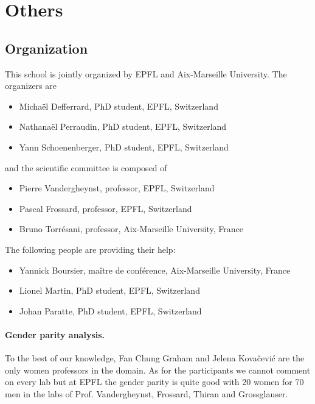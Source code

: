 \documentclass[a4paper]{scrartcl}
\begin{document}
\section{Others}

\subsection{Organization}

This school is jointly organized by EPFL and Aix-Marseille University. The
organizers are
\begin{itemize}
	\setlength{\itemsep}{0pt} \setlength{\parskip}{0pt}
	\item Michaël Defferrard, PhD student, EPFL, Switzerland
	\item Nathanaël Perraudin, PhD student, EPFL, Switzerland
	\item Yann Schoenenberger, PhD student, EPFL, Switzerland
\end{itemize}
and the scientific committee is composed of
\begin{itemize}
	\setlength{\itemsep}{0pt} \setlength{\parskip}{0pt}
	\item Pierre Vandergheynst, professor, EPFL, Switzerland
	\item Pascal Frossard, professor, EPFL, Switzerland
	\item Bruno Torrésani, professor, Aix-Marseille University, France
\end{itemize}
The following people are providing their help:
\begin{itemize}
	\setlength{\itemsep}{0pt} \setlength{\parskip}{0pt}
	\item Yannick Boursier, maître de conférence, Aix-Marseille University, France
	\item Lionel Martin, PhD student, EPFL, Switzerland
	\item Johan Paratte, PhD student, EPFL, Switzerland
\end{itemize}

\paragraph{Gender parity analysis.} To the best of our knowledge, Fan Chung
Graham and Jelena Kovačević are the only women professors in the domain. As for
the participants we cannot comment on every lab but at EPFL the gender parity is
quite good with 20 women for 70 men in the labs of Prof. Vandergheynst,
Frossard, Thiran and Grossglauser.
\end{document}
